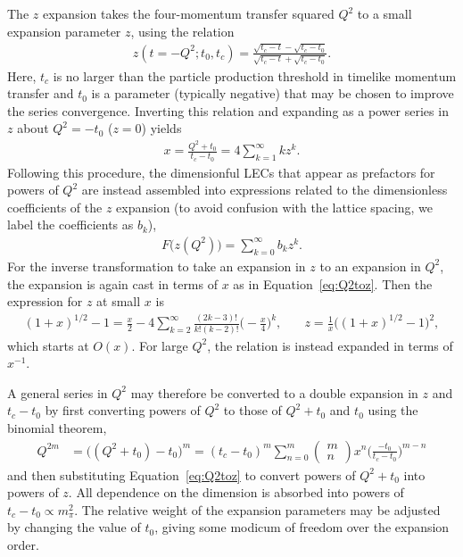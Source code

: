 \documentclass{ar-1col}
\newcommand{\change}[1]{{\color{red} #1}}
\begin{document}
The $z$ expansion takes the four-momentum transfer squared $Q^2$
 to a small expansion parameter $z$, using the relation
\begin{align}
 z(t=-Q^2;t_0,t_c) = \frac{\sqrt{t_c-t} -\sqrt{t_c-t_0}}{ \sqrt{t_c-t} +\sqrt{t_c-t_0}}.
\end{align}
Here, $t_c$ is no larger than the particle production threshold in timelike momentum transfer
 and $t_0$ is a parameter (typically negative) that
 may be chosen to improve the series convergence.
Inverting this relation and expanding as a power series in $z$ about $Q^2=-t_0$ ($z=0$) yields
\begin{align}
x =  \frac{Q^2+t_0}{t_c-t_0} = 4 \sum_{k=1}^\infty k z^k.
 \label{eq:Q2toz}
\end{align}
Following this procedure, the dimensionful LECs that appear as prefactors for powers of $Q^2$
 are instead assembled into expressions related to the dimensionless
 coefficients of the $z$ expansion (to avoid confusion with the lattice spacing, we label the coefficients as $b_k$),
\begin{align}
 F\big(z(Q^2)\big) = \sum_{k=0}^\infty b_k z^k.
 \label{eq:zexp}
\end{align}
%
For the inverse transformation to take an expansion in $z$ to an expansion in $Q^2$,
 the expansion is again cast in terms of $x$
\change{as} in Equation~\ref{eq:Q2toz}.
Then the expression for $z$ at small $x$ is
\begin{align}
 (1+x)^{1/2} -1 = \frac{x}{2}
 -4\sum_{k=2}^\infty \frac{(2k-3)!}{k!(k-2)!} \biggr( -\frac{x}{4} \biggr)^{k},
 &\quad
 z = \frac{1}{x} \big( (1+x)^{1/2} -1 \big)^2,
 \label{eq:ztoQ2}
\end{align}
 which starts at $O(x)$.
For large $Q^2$, the relation is instead expanded in terms of $x^{-1}$.

A general series in $Q^2$ may therefore be converted to a double expansion in $z$ and $t_c-t_0$
 by first converting powers of $Q^2$ to those of $Q^2+t_0$ and $t_0$ using the  binomial theorem,
\begin{align}
 Q^{2m} &= \big( (Q^2+t_0) -t_0 \big)^m
 = (t_c-t_0)^m
 \sum_{n=0}^{m} \left( \begin{array}{c} m \\ n \end{array} \right)
 x^n
 \biggr( \frac{-t_0}{t_c-t_0} \biggr)^{m-n}
\end{align}
 and then substituting Equation~\ref{eq:Q2toz} to convert powers of $Q^2+t_0$
 into powers of $z$.
All dependence on the dimension is absorbed into powers of $t_c-t_0 \propto m_\pi^2$.
The relative weight of the expansion parameters may be adjusted by changing
 the value of $t_0$, giving some modicum of freedom over the expansion order.
\end{document}
